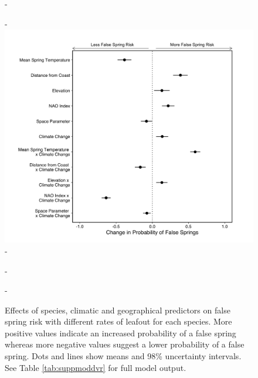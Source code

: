 \documentclass{article}\usepackage[]{graphicx}\usepackage[]{color}
\begin{document}
  {\begin{figure} [H]
  -\begin{center}
  -\includegraphics[width=12cm]{..//analyses/figures/model_output_98_dvr.png}
  -\caption{Effects of species, climatic and geographical predictors on false spring risk with different rates of leafout for each species. More positive values indicate an increased probability of a false spring whereas more negative values suggest a lower probability of a false spring. Dots and lines show means and 98\% uncertainty intervals. See Table \ref{tab:suppmoddvr} for full model output. }\label{fig:dvr}
  -\end{center}
  -\end{figure}}
  
\end{document}
